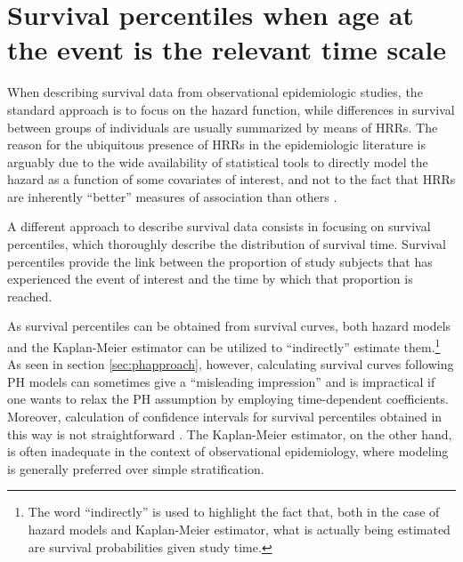 %



\section{Survival percentiles when age at the event is the relevant time scale}

When describing survival data from observational epidemiologic studies, the standard approach is to focus on the hazard function, while differences in survival between groups of individuals are usually summarized by means of HRRs. The reason for the ubiquitous presence of HRRs in the epidemiologic literature is arguably due to the wide availability of statistical tools to directly model the hazard as a function of some covariates of interest, and not  to the fact that HRRs are inherently ``better'' measures of association than others \citep{hernan_hazards_2010, uno_moving_2014}.

A different approach to describe survival data consists in focusing on survival percentiles, which thoroughly describe the distribution of survival time. Survival percentiles provide the link between the proportion of study subjects that has experienced the event of interest and the time by which that proportion is reached. 

As survival percentiles can be obtained from survival curves, both hazard models and the Kaplan-Meier estimator can be utilized to ``indirectly'' estimate them.\footnote{The word ``indirectly'' is used to highlight the fact that, both in the case of hazard models and Kaplan-Meier estimator, what is actually being estimated are survival probabilities given study time.} As seen in section \ref{sec:phapproach}, however, calculating survival curves following PH models can sometimes give a ``misleading impression'' \citep{kalbfleisch_statistical_2002} and is impractical if one wants to relax the PH assumption by employing time-dependent coefficients.  Moreover, calculation of confidence intervals for survival percentiles obtained in this way is not straightforward \citep{burr_comparison_1994, lai_confidence_2006}. The Kaplan-Meier estimator, on the other hand, is often inadequate in the context of observational epidemiology, where modeling is generally preferred over simple stratification. 

